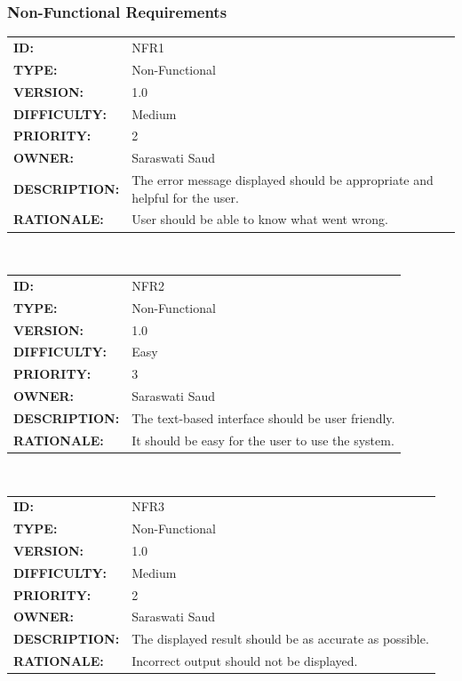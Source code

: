 \documentclass[a4paper,12pt]{article}
\begin{document}
        \subsubsection{Non-Functional Requirements}
        \begin{tabular}{ |p{4cm} | p{11cm}| }
            \hline
            \textbf{ID:} & NFR1\\
            \textbf{TYPE:} & Non-Functional\\
            \textbf{VERSION:} & 1.0\\
            \textbf{DIFFICULTY:} & Medium\\
            \textbf{PRIORITY:} & 2\\
            \textbf{OWNER:} & Saraswati Saud\\
            \textbf{DESCRIPTION:} & The error message displayed should be appropriate and helpful for the user. \\
            \textbf{RATIONALE:} & User should be able to know what went wrong. \\
            \hline
        \end{tabular}
        \\[10pt]
        \begin{tabular}{ |p{4cm} | p{11cm}| }
            \hline
            \textbf{ID:} & NFR2\\
            \textbf{TYPE:} & Non-Functional\\
            \textbf{VERSION:} & 1.0\\
            \textbf{DIFFICULTY:} & Easy\\
            \textbf{PRIORITY:} & 3\\
            \textbf{OWNER:} & Saraswati Saud\\
            \textbf{DESCRIPTION:} & The text-based interface should be user friendly. \\
            \textbf{RATIONALE:} & It should be easy for the user to use the system. \\
            \hline
        \end{tabular}
        \\[10pt]
        \begin{tabular}{ |p{4cm} | p{11cm}| }
            \hline
            \textbf{ID:} & NFR3\\
            \textbf{TYPE:} & Non-Functional\\
            \textbf{VERSION:} & 1.0\\
            \textbf{DIFFICULTY:} & Medium\\
            \textbf{PRIORITY:} & 2\\
            \textbf{OWNER:} & Saraswati Saud\\
            \textbf{DESCRIPTION:} & The displayed result should be as accurate as possible. \\
            \textbf{RATIONALE:} & Incorrect output should not be displayed. \\
            \hline
        \end{tabular}
\end{document}
